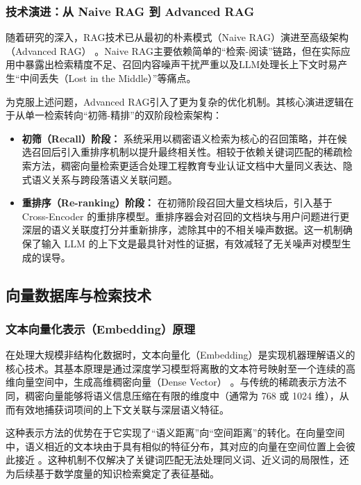 \documentclass[UTF8,a4paper,zihao=-4]{ctexart}
\begin{document}
\subsubsection{技术演进：从 Naive RAG 到 Advanced RAG}
随着研究的深入，RAG技术已从最初的朴素模式（Naive RAG）演进至高级架构（Advanced RAG）\cite{gao_retrieval-augmented_2024}
。Naive RAG主要依赖简单的“检索-阅读”链路，但在实际应用中暴露出检索精度不足、召回内容噪声干扰严重以及LLM处理长上下文时易产生“中间丢失（Lost in the Middle）”等痛点\cite{luo_does_2025}。

为克服上述问题，Advanced RAG引入了更为复杂的优化机制。其核心演进逻辑在于从单一检索转向“初筛-精排”的双阶段检索架构：
\begin{itemize}
    \item \textbf{初筛（Recall）阶段：} 系统采用以稠密语义检索为核心的召回策略，并在候选召回后引入重排序机制以提升最终相关性。相较于依赖关键词匹配的稀疏检索方法，稠密向量检索更适合处理工程教育专业认证文档中大量同义表达、隐式语义关系与跨段落语义关联问题\cite{gao_retrieval-augmented_2024,lewis_retrieval-augmented_2021}。
    \item \textbf{重排序（Re-ranking）阶段：} 在初筛阶段召回大量文档块后，引入基于 Cross-Encoder 的重排序模型。重排序器会对召回的文档块与用户问题进行更深层的语义关联度打分并重新排序，滤除其中的不相关噪声数据。这一机制确保了输入 LLM 的上下文是最具针对性的证据，有效减轻了无关噪声对模型生成的误导\cite{gao_retrieval-augmented_2024}。
\end{itemize}
\subsection{向量数据库与检索技术}
\subsubsection{文本向量化表示（Embedding）原理}
在处理大规模非结构化数据时，文本向量化（Embedding）是实现机器理解语义的核心技术。其基本原理是通过深度学习模型将离散的文本符号映射至一个连续的高维向量空间中，生成高维稠密向量（Dense Vector）\cite{ma_comprehensive_2025}
。与传统的稀疏表示方法不同，稠密向量能够将语义信息压缩在有限的维度中（通常为 768 或 1024 维），从而有效地捕获词项间的上下文关联与深层语义特征\cite{ma_comprehensive_2025,taipalus_vector_2024}。

这种表示方法的优势在于它实现了“语义距离”向“空间距离”的转化。在向量空间中，语义相近的文本块由于具有相似的特征分布，其对应的向量在空间位置上会彼此接近\cite{taipalus_vector_2024,sys_rag}
。这种机制不仅解决了关键词匹配无法处理同义词、近义词的局限性，还为后续基于数学度量的知识检索奠定了表征基础。
\end{document}

